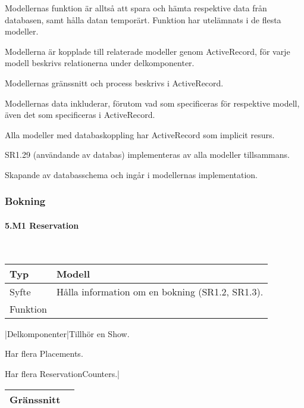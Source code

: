 \documentclass[a4paper, twoside, 11pt, titlepage]{article}
\begin{document}
	Modellernas funktion är alltså att spara och hämta respektive data från databasen, samt hålla datan temporärt. Funktion har utelämnats i de flesta modeller.

	Modellerna är kopplade till relaterade modeller genom ActiveRecord, för varje modell beskrivs relationerna under delkomponenter.

	Modellernas gränssnitt och process beskrivs i ActiveRecord.

	Modellernas data inkluderar, förutom vad som specificeras för respektive modell, även det som specificeras i ActiveRecord.

	Alla modeller med databaskoppling har ActiveRecord som implicit resurs.

	SR1.29 (användande av databas) implementeras av alla modeller tillsammans.

	Skapande av databasschema och ingår i modellernas implementation.


		\subsubsection{Bokning}



			\paragraph{5.M1 Reservation}\

			\begin {table} [ht] \begin{tabular} {  p{3.5cm} p{9.6cm} }
				\hline
				Typ & Modell  \\
				\hline
				Syfte & Hålla information om en bokning (SR1.2, SR1.3).  \\
				\hline
				Funktion &   \\
				\hline
			\end{tabular} \end{table} \FloatBarrier
			\vspace{6mm}

			|Delkomponenter|Tillhör en Show.

			Har flera Placements.

			Har flera ReservationCounters.|

			\begin {table} [ht] \begin{tabular} {  p{3.5cm} p{9.6cm} }
				\hline
				Gränssnitt &   \\
				\hline
			\end{tabular} \end{table} \FloatBarrier
			\vspace{6mm}
\end{document}
